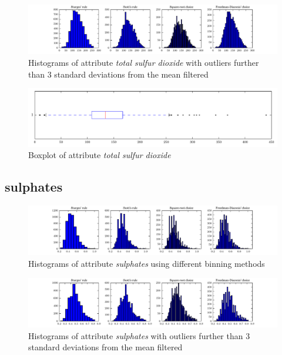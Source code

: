 \documentclass{report}
\begin{document}
\begin{figure}[H]
\includegraphics[width=\textwidth]{histograms/total_sulfur_dioxide_filtered.pdf}
\caption{Histograms of attribute \emph{total sulfur dioxide} with outliers further than 3 standard deviations from the mean filtered}\n\end{figure}

\begin{figure}[H]
\includegraphics[width=\textwidth]{boxplots/total_sulfur_dioxide.pdf}
\caption{Boxplot of attribute \emph{total sulfur dioxide}}\end{figure}

\newpage\subsection{sulphates}
\begin{figure}[H]
\includegraphics[width=\textwidth]{histograms/sulphates.pdf}
\caption{Histograms of attribute \emph{sulphates} using different binning methods}\end{figure}

\begin{figure}[H]
\includegraphics[width=\textwidth]{histograms/sulphates_filtered.pdf}
\caption{Histograms of attribute \emph{sulphates} with outliers further than 3 standard deviations from the mean filtered}\n\end{figure}
\end{document}
